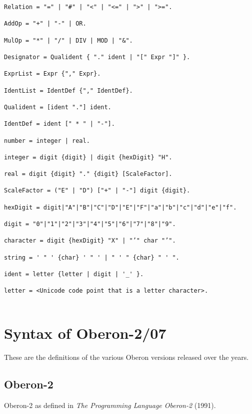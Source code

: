 \documentclass[12pt]{article}
\begin{document}
{\begin{lstlisting}[style=EBNF]
Relation = "=" | "#" | "<" | "<=" | ">" | ">=".

AddOp = "+" | "-" | OR.

MulOp = "*" | "/" | DIV | MOD | "&".

Designator = Qualident { "." ident | "[" Expr "]" }. 

ExprList = Expr {"," Expr}.

IdentList = IdentDef {"," IdentDef}.

Qualident = [ident "."] ident.

IdentDef = ident [" * " | "-"].

number = integer | real.

integer = digit {digit} | digit {hexDigit} "H".

real = digit {digit} "." {digit} [ScaleFactor]. 

ScaleFactor = ("E" | "D") ["+" | "-"] digit {digit}.

hexDigit = digit|"A"|"B"|"C"|"D"|"E"|"F"|"a"|"b"|"c"|"d"|"e"|"f".

digit = "0"|"1"|"2"|"3"|"4"|"5"|"6"|"7"|"8"|"9".

character = digit {hexDigit} "X" | "’" char "’".

string = ' " ' {char} ' " ' | " ' " {char} " ' ".

ident = letter {letter | digit | '_' }.

letter = <Unicode code point that is a letter character>.
 
\end{lstlisting}}

\section{Syntax of Oberon-2/07}

These are the definitions of the various Oberon versions released over the years.

\subsection{Oberon-2}

Oberon-2 as defined in {\em The Programming Language Oberon-2} (1991).
\end{document}
